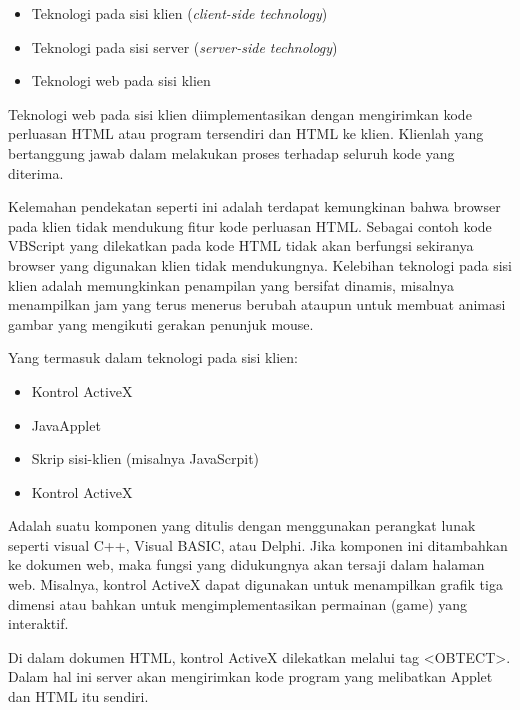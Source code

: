 \documentclass[11pt]{article}
\begin{document}
\begin{itemize}
	\item Teknologi pada sisi klien (\textit{client-side technology})
	\item Teknologi pada sisi server (\textit{server-side technology})
\end{itemize}

\begin{itemize}
	\item Teknologi web pada sisi klien
\end{itemize}

Teknologi web pada sisi klien diimplementasikan dengan mengirimkan kode perluasan HTML atau program tersendiri dan HTML ke klien. Klienlah yang bertanggung jawab dalam melakukan proses terhadap seluruh kode yang diterima.

Kelemahan pendekatan seperti ini adalah terdapat kemungkinan bahwa browser pada klien tidak mendukung fitur kode perluasan HTML. Sebagai contoh kode VBScript yang dilekatkan pada kode HTML tidak akan berfungsi sekiranya browser yang digunakan klien tidak mendukungnya. Kelebihan teknologi pada sisi klien adalah memungkinkan penampilan yang bersifat dinamis, misalnya menampilkan jam yang terus menerus berubah ataupun untuk membuat animasi gambar yang mengikuti gerakan penunjuk mouse.

Yang termasuk dalam teknologi pada sisi klien:

\begin{itemize}
	\item Kontrol ActiveX
	\item JavaApplet
	\item Skrip sisi-klien (misalnya JavaScrpit)
\end{itemize}

\begin{itemize}
	\item Kontrol ActiveX
\end{itemize}

Adalah suatu komponen yang ditulis dengan menggunakan perangkat lunak seperti visual C++, Visual BASIC, atau Delphi. Jika komponen ini ditambahkan ke dokumen web, maka fungsi yang didukungnya akan tersaji dalam halaman web. Misalnya, kontrol ActiveX dapat digunakan untuk menampilkan grafik tiga dimensi atau bahkan untuk mengimplementasikan permainan (game) yang interaktif.

Di dalam dokumen HTML, kontrol ActiveX dilekatkan melalui tag <OBTECT>. Dalam hal ini server akan mengirimkan kode program yang melibatkan Applet dan HTML itu sendiri.
\end{document}
